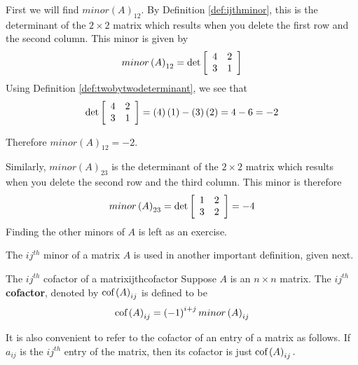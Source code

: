 \begin{solution} First we will find $minor\left( A\right) _{12}$. By Definition
\ref{def:ijthminor}, this is the determinant of the $2\times 2$ matrix
which results when you delete the first row and the second column. This
minor is given by
\begin{equation*}
minor \left(A\right)_{12}
=
\det \left[
\begin{array}{rr}
4 & 2 \\
3 & 1
\end{array}
\right]
\end{equation*}
Using Definition \ref{def:twobytwodeterminant}, we see that 
\begin{equation*}
\det \left[
\begin{array}{rr}
4 & 2 \\
3 & 1
\end{array}
\right] = \left(4\right)\left(1\right) - \left(3\right)\left(2\right) = 4 - 6 = -2
\end{equation*}

Therefore $minor \left(A\right)_{12} = -2$. 

Similarly, $minor\left(A\right)_{23}$ is the determinant of the $2\times 2$ matrix
which results when you delete the second row and the third column. This
minor is therefore
\begin{equation*}
minor \left(A\right)_{23} 
=
\det \left[
\begin{array}{rr}
1 & 2 \\
3 & 2
\end{array}
\right] = -4
\end{equation*}
Finding the other minors of $A$ is left as an exercise. 
\end{solution}

The $ij^{th}$ minor of a matrix $A$ is used in another important definition, given next.

\begin{definition}{The $ij^{th}$ cofactor of a matrix}{ijthcofactor}
Suppose $A$ is an $n\times n$ matrix. The $ij^{th}$ \textbf{cofactor}, denoted by $\mbox{cof}\left( A\right) _{ij}$ is
defined to be 
\begin{equation*}
\mbox{cof}\left( A\right) _{ij} = \left( -1\right) ^{i+j} minor\left(A\right)_{ij} 
\end{equation*}
\end{definition}

It is also convenient to refer to the
cofactor of an entry of a matrix as follows. If $a_{ij}$ is the $ij^{th}$ entry of the
matrix, then its cofactor is just $\mbox{cof}\left( A\right) _{ij}.$

